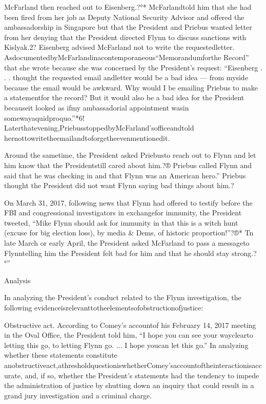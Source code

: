 McFarland then reached out to Eisenberg.?°*
McFarlandtold him that she had been fired from her job as Deputy National Security Advisor and offered the ambassadorship in Singapore but that the President and Priebus wanted letter from her denying that the President directed Flynn to discuss sanctions with Kislyak.2?
Eisenberg advised McFarland not to write the requestedletter.
AsdocumentedbyMcFarlandinacontemporaneous“Memorandumforthe Record” that she wrote because she was concerned by the President’s request: “Eisenberg . . . thought the requested email andletter would be a bad idea — from myside because the email would be awkward.
Why would I be emailing Priebus to make a statementfor the record?
But it would also be a bad idea for the President becauseit looked as ifmy ambassadorial appointment wasin somewayaquidproquo.”*6!
Laterthatevening,PriebusstoppedbyMcFarland’sofficeandtold hernottowritetheemailandtoforgetheevenmentionedit.

Around the sametime, the President asked Priebusto reach out to Flynn and let him know that the Presidentstill cared about him.?®
Priebus called Flynn and said that he was checking in and that Flynn was an American hero.”
Priebus thought the President did not want Flynn saying bad things about him.?

On March 31, 2017, following news that Flynn had offered to testify before the FBI and congressional investigators in exchangefor immunity, the President tweeted, “Mike Flynn should ask for immunity in that this is a witch hunt (excuse for big election loss), by media & Dems, of historic proportion!”?®*
Tn late March or early April, the President asked McFarland to pass a messageto Flynntelling him the President felt bad for him and that he should stay strong.?°”

Analysis

In analyzing the President’s conduct related to the Flynn investigation, the following evidenceisrelevanttotheelementsofobstructionofjustice:

Obstructive act.
According to Comey’s accountof his February 14, 2017 meeting in the Oval Office, the President told him, “I hope you can see your wayclearto letting this go, to letting Flynn go. ... I hope youcan let this go.”
In analyzing whether these statements constitute anobstructiveact,athresholdquestioniswhetherComey’saccountoftheinteractionisaccurate, and, if so, whether the President’s statements had the tendency to impede the administration of
justice by shutting down an inquiry that could result in a grand jury investigation and a criminal charge.


